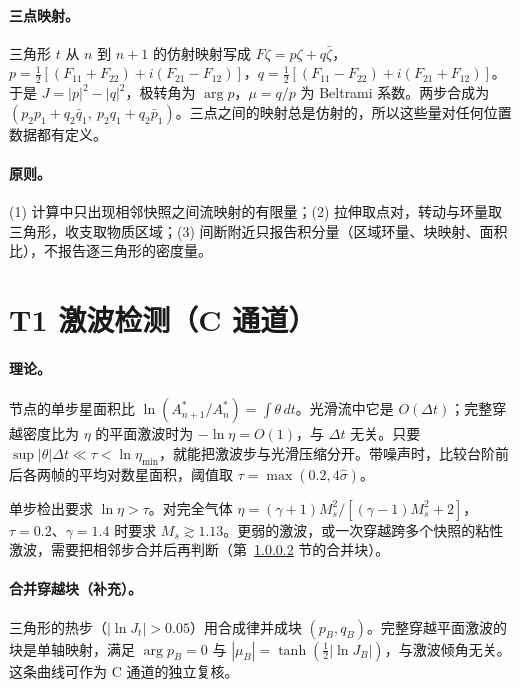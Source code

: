 \paragraph{三点映射。}三角形 $t$ 从 $n$ 到 $n+1$ 的仿射映射写成 $F\zeta=p\zeta+q\bar\zeta$，
$p=\tfrac12[(F_{11}+F_{22})+i(F_{21}-F_{12})]$，$q=\tfrac12[(F_{11}-F_{22})+i(F_{21}+F_{12})]$。于是 $J=|p|^2-|q|^2$，极转角为 $\arg p$，$\mu=q/p$ 为 Beltrami 系数。两步合成为 $(p_2p_1+q_2\bar q_1,\ p_2q_1+q_2\bar p_1)$。三点之间的映射总是仿射的，所以这些量对任何位置数据都有定义。

\paragraph{原则。}(1) 计算中只出现相邻快照之间流映射的有限量；(2) 拉伸取点对，转动与环量取三角形，收支取物质区域；(3) 间断附近只报告积分量（区域环量、块映射、面积比），不报告逐三角形的密度量。

\section{T1 激波检测（C 通道）}

\paragraph{理论。}节点的单步星面积比 $\ln(A^\ast_{n+1}/A^\ast_n)=\int\theta\,dt$。光滑流中它是 $O(\Delta t)$；完整穿越密度比为 $\eta$ 的平面激波时为 $-\ln\eta=O(1)$，与 $\Delta t$ 无关。只要 $\sup|\theta|\Delta t\ll\tau<\ln\eta_{\min}$，就能把激波步与光滑压缩分开。带噪声时，比较台阶前后各两帧的平均对数星面积，阈值取 $\tau=\max(0.2,4\hat\sigma)$。

\begin{proposition}[可检出的最弱激波]
单步检出要求 $\ln\eta>\tau$。对完全气体 $\eta=(\gamma+1)M_s^2/[(\gamma-1)M_s^2+2]$，$\tau=0.2$、$\gamma=1.4$ 时要求 $M_s\gtrsim1.13$。更弱的激波，或一次穿越跨多个快照的粘性激波，需要把相邻步合并后再判断（第~\ref{pA:sec:block} 节的合并块）。
\end{proposition}

\paragraph{合并穿越块（补充）。}\label{pA:sec:block}三角形的热步（$|\ln J_t|>0.05$）用合成律并成块 $(p_B,q_B)$。完整穿越平面激波的块是单轴映射，满足 $\arg p_B=0$ 与 $|\mu_B|=\tanh(\tfrac12|\ln J_B|)$，与激波倾角无关。这条曲线可作为 C 通道的独立复核。

